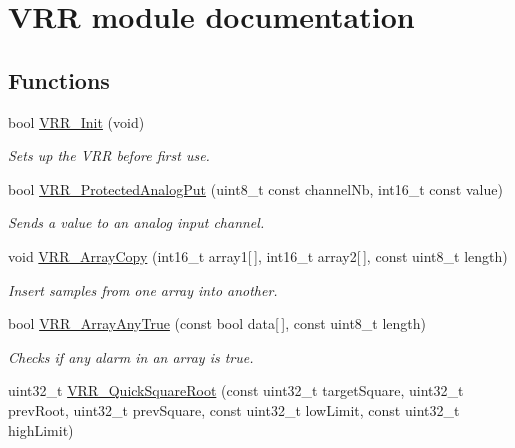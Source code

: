 \hypertarget{group___v_r_r__module}{}\section{V\+R\+R module documentation}
\label{group___v_r_r__module}
\subsection*{Functions}
\begin{DoxyCompactItemize}
\item 
bool \hyperlink{group___v_r_r__module_ga756bc6b6907a4561fe65c47e79fcac7a}{V\+R\+R\+\_\+\+Init} (void)
\begin{DoxyCompactList}\small\item\em Sets up the V\+R\+R before first use. \end{DoxyCompactList}\item 
bool \hyperlink{group___v_r_r__module_ga93027d44790f5625dc76fe8546c9692b}{V\+R\+R\+\_\+\+Protected\+Analog\+Put} (uint8\+\_\+t const channel\+Nb, int16\+\_\+t const value)
\begin{DoxyCompactList}\small\item\em Sends a value to an analog input channel. \end{DoxyCompactList}\item 
void \hyperlink{group___v_r_r__module_ga8522aea3405b3832f6d4b685f98abef8}{V\+R\+R\+\_\+\+Array\+Copy} (int16\+\_\+t array1\mbox{[}$\,$\mbox{]}, int16\+\_\+t array2\mbox{[}$\,$\mbox{]}, const uint8\+\_\+t length)
\begin{DoxyCompactList}\small\item\em Insert samples from one array into another. \end{DoxyCompactList}\item 
bool \hyperlink{group___v_r_r__module_ga77bce40d62678d121ab09cb771c49493}{V\+R\+R\+\_\+\+Array\+Any\+True} (const bool data\mbox{[}$\,$\mbox{]}, const uint8\+\_\+t length)
\begin{DoxyCompactList}\small\item\em Checks if any alarm in an array is true. \end{DoxyCompactList}\item 
uint32\+\_\+t \hyperlink{group___v_r_r__module_ga71340103bb9bb352a49355047d8ca2fe}{V\+R\+R\+\_\+\+Quick\+Square\+Root} (const uint32\+\_\+t target\+Square, uint32\+\_\+t prev\+Root, uint32\+\_\+t prev\+Square, const uint32\+\_\+t low\+Limit, const uint32\+\_\+t high\+Limit)

\end{DoxyCompactItemize}
